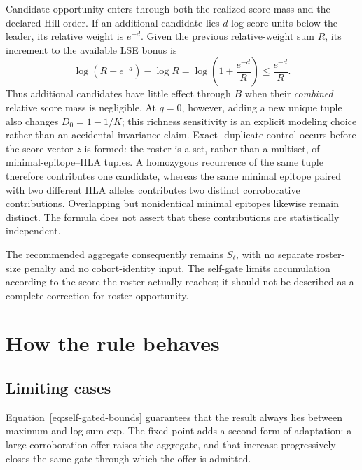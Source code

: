 \documentclass[11pt]{article}
\begin{document}
Candidate opportunity enters through both the realized score mass and the
declared Hill order. If an additional candidate lies $d$ log-score units below
the leader, its relative weight is $e^{-d}$. Given the previous
relative-weight sum $R$, its increment to the available LSE bonus is
\begin{equation}
\log\!\left(R+e^{-d}\right)-\log R
=
\log\!\left(1+\frac{e^{-d}}{R}\right)
\leq
\frac{e^{-d}}{R}.
\end{equation}
Thus additional candidates have little effect through $B$ when their
\emph{combined} relative score mass is negligible. At $q=0$, however, adding a
new unique tuple also changes $D_0=1-1/K$; this richness sensitivity is an
explicit modeling choice rather than an accidental invariance claim. Exact-
duplicate control occurs before the score vector $z$ is formed: the roster is
a set, rather than a multiset, of minimal-epitope--HLA tuples. A homozygous
recurrence of the same tuple therefore contributes one candidate, whereas the
same minimal epitope paired with two different HLA alleles contributes two
distinct corroborative contributions. Overlapping but nonidentical minimal
epitopes likewise remain distinct. The formula does not assert that these
contributions are statistically independent.

The recommended aggregate consequently remains
$S_\ell$, with no separate roster-size penalty and no
cohort-identity input. The self-gate limits accumulation according to the
score the roster actually reaches; it should not be described as a complete
correction for roster opportunity.

\clearpage
\section{How the rule behaves}

\subsection{Limiting cases}

Equation~\eqref{eq:self-gated-bounds} guarantees that the result always lies
between maximum and log-sum-exp. The fixed point adds a second form of
adaptation: a large corroboration offer raises the aggregate, and that increase
progressively closes the same gate through which the offer is admitted.
\end{document}
